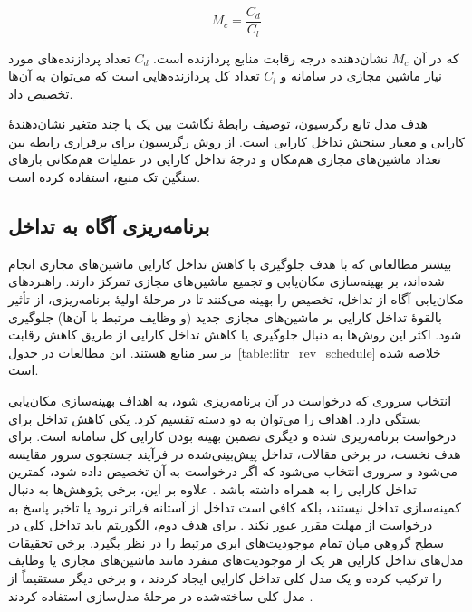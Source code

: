 \begin{equation}
    M_c = \frac{C_d}{C_l}
\end{equation}

که در آن $M_c$ نشان‌دهنده درجه رقابت منابع پردازنده است. $C_d$ تعداد پردازنده‌های مورد نیاز ماشین مجازی در سامانه و $C_l$ تعداد کل پردازنده‌هایی است که می‌توان به آن‌ها تخصیص داد.

هدف مدل تابع رگرسیون، توصیف رابطهٔ نگاشت بین یک یا چند متغیر نشان‌دهندهٔ کارایی و معیار سنجش تداخل کارایی است. \cite{jersak2016performance} از روش رگرسیون برای برقراری رابطه بین تعداد ماشین‌های مجازی هم‌مکان و درجهٔ تداخل کارایی در عملیات هم‌مکانی بارهای سنگین تک منبع، استفاده کرده است.

\subsection{برنامه‌ریزی آگاه به تداخل}

بیشتر مطالعاتی که با هدف جلوگیری یا کاهش تداخل کارایی ماشین‌های مجازی انجام شده‌اند، بر بهینه‌سازی مکان‌یابی و تجمیع ماشین‌های مجازی تمرکز دارند. راهبردهای مکان‌یابی آگاه از تداخل، تخصیص را بهینه می‌کنند تا در مرحلهٔ اولیهٔ برنامه‌ریزی، از تأثیر بالقوهٔ تداخل کارایی بر ماشین‌های مجازی جدید (و وظایف مرتبط با آن‌ها) جلوگیری شود. اکثر این روش‌ها به دنبال جلوگیری یا کاهش تداخل کارایی از طریق کاهش رقابت بر سر منابع هستند. این مطالعات در جدول~\ref{table:litr_rev_schedule} خلاصه شده‌ است.

انتخاب سروری که درخواست در آن برنامه‌ریزی شود، به اهداف بهینه‌سازی مکان‌یابی بستگی دارد. اهداف را می‌توان به دو دسته تقسیم کرد. یکی کاهش تداخل برای درخواست برنامه‌ریزی شده و دیگری تضمین بهینه بودن کارایی کل سامانه است. برای هدف نخست، در برخی مقالات، تداخل پیش‌بینی‌شده در فرآیند جستجوی سرور مقایسه می‌شود و سروری انتخاب می‌شود که اگر درخواست به آن تخصیص داده شود، کمترین تداخل کارایی را به همراه داشته باشد \cite{zhang2015minimizing,romero2018mage}. علاوه بر این، برخی پژوهش‌ها به دنبال کمینه‌سازی تداخل نیستند، بلکه کافی است تداخل از آستانه فراتر نرود \cite{Bu2013ILA, jersak2016performance, angelou2016improving} یا تاخیر پاسخ به درخواست از مهلت مقرر عبور نکند \cite{Chen2017Prophet}. برای هدف دوم، الگوریتم باید تداخل کلی در سطح گروهی میان تمام موجودیت‌های ابری مرتبط را در نظر بگیرد. برخی تحقیقات مدل‌های تداخل کارایی هر یک از موجودیت‌های منفرد مانند ماشین‌های مجازی یا وظایف را ترکیب کرده و یک مدل کلی تداخل کارایی ایجاد کردند \cite{meloalves2018interference-lin2012interference}، و برخی دیگر مستقیماً از مدل کلی ساخته‌شده در مرحلهٔ مدل‌سازی استفاده کردند \cite{Shaw2019Energy}.


